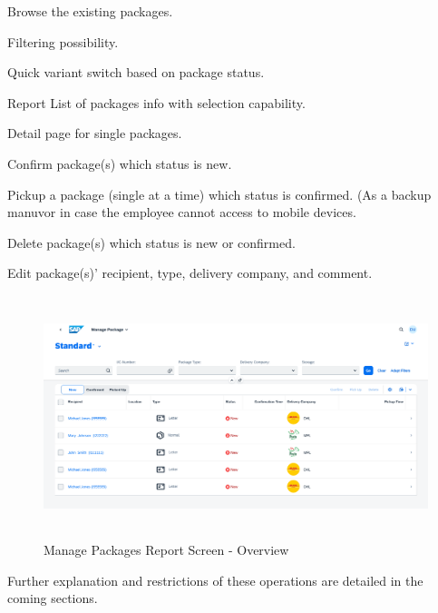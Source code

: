 \begin{compactenum}
	\item Browse the existing packages.
        \begin{compactenum}
            \item Filtering possibility.
            \item Quick variant switch based on package status.
            \item Report List of packages info with selection capability.
            \item Detail page for single packages.
        \end{compactenum}
    \item Confirm package(s) which status is new.
    \item Pickup a package (single at a time) which status is confirmed. (As a backup manuvor in case the employee cannot access to mobile devices.
    \item Delete package(s) which status is new or confirmed.
    \item Edit package(s)' recipient, type, delivery company, and comment.
\end{compactenum}


\begin{figure}[H]
	\centering
	\includegraphics[height=200pt]{images/user_doc/managePack/ReportScreen/browse/Overview.png}
	\caption{Manage Packages Report Screen - Overview}
	\label{fig:MPReportOverview}
\end{figure}

\bigskip
Further explanation and restrictions of these operations are detailed in the coming sections.


